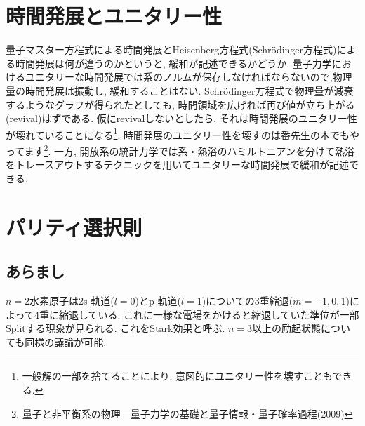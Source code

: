 \documentclass[10.5pt,a4paper]{jreport}
\begin{document}
\section{時間発展とユニタリー性}
量子マスター方程式による時間発展とHeisenberg方程式(Schr\"odinger方程式)による時間発展は何が違うのかというと, 緩和が記述できるかどうか. 量子力学におけるユニタリーな時間発展では系のノルムが保存しなければならないので,物理量の時間発展は振動し, 緩和することはない. Schr\"odinger方程式で物理量が減衰するようなグラフが得られたとしても, 時間領域を広げれば再び値が立ち上がる(revival)はずである. 仮にrevivalしないとしたら, それは時間発展のユニタリー性が壊れていることになる\footnote{一般解の一部を捨てることにより, 意図的にユニタリー性を壊すこともできる.}. 時間発展のユニタリー性を壊すのは番先生の本でもやってます\footnote{量子と非平衡系の物理―量子力学の基礎と量子情報・量子確率過程(2009)}. 一方, 開放系の統計力学では系・熱浴のハミルトニアンを分けて熱浴をトレースアウトするテクニックを用いてユニタリーな時間発展で緩和が記述できる.

\section{パリティ選択則}
\subsection{あらまし}
$n=2$水素原子は2s-軌道($l=0$)とp-軌道($l=1$)についての3重縮退($m=-1,0,1$)によって4重に縮退している. これに一様な電場をかけると縮退していた準位が一部Splitする現象が見られる. これをStark効果と呼ぶ. $n=3$以上の励起状態についても同様の議論が可能.
\end{document}
